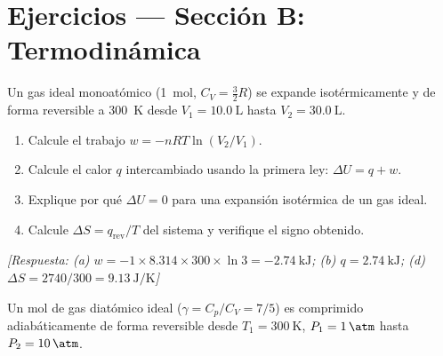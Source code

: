 
\section*{Ejercicios --- Secci\'on B: Termodin\'amica}
\label{sec:ejercicios_cap01b}

\begin{bloque_ejercicios}

\begin{ejercicios}

\item Un gas ideal monoat\'omico (\SI{1}{\mole},
$C_V = \tfrac{3}{2}R$) se expande isot\'ermicamente y de forma
reversible a \SI{300}{\kelvin} desde $V_1 = \SI{10.0}{\liter}$
hasta $V_2 = \SI{30.0}{\liter}$.

\begin{enumerate}[label=\alph*)]
    \item Calcule el trabajo $w = -nRT\ln(V_2/V_1)$.
    \item Calcule el calor $q$ intercambiado usando la
          primera ley: $\Delta U = q + w$.
    \item Explique por qu\'e $\Delta U = 0$ para una
          expansi\'on isot\'ermica de un gas ideal.
    \item Calcule $\Delta S = q_{\text{rev}}/T$ del sistema
          y verifique el signo obtenido.
\end{enumerate}

\textit{[Respuesta:
(a) $w = -1\times8.314\times300\times\ln3
= \SI{-2.74}{\kilo\joule}$;
(b) $q = \SI{+2.74}{\kilo\joule}$;
(d) $\Delta S = 2740/300 = \SI{+9.13}{\joule\per\kelvin}$]}

\item Un mol de gas diat\'omico ideal ($\gamma = C_p/C_V = 7/5$)
es comprimido adiab\'aticamente de forma reversible desde
$T_1 = \SI{300}{\kelvin}$, $P_1 = \SI{1}{\atm}$ hasta
$P_2 = \SI{10}{\atm}$.


\end{ejercicios}
\end{bloque_ejercicios}
